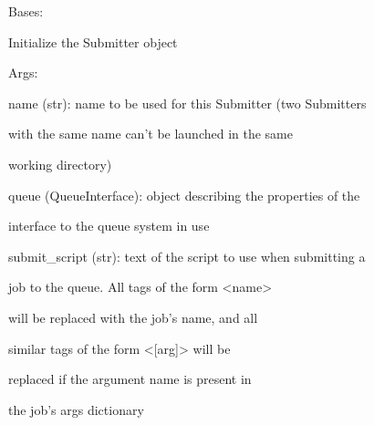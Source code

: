 \documentclass[letterpaper,10pt,english]{sphinxmanual}
\begin{document}
\begin{fulllineitems}
\label{doctree/soprano.hpc.submitter.castep:soprano.hpc.submitter.castep.CastepSubmitter}
Bases: {\hyperref[doctree/soprano.hpc.submitter.submit:soprano.hpc.submitter.submit.Submitter]{}}

Initialize the Submitter object

\begin{DUlineblock}{0em}
\item[] Args:
\item[]
\begin{DUlineblock}{\DUlineblockindent}
\item[] name (str): name to be used for this Submitter (two Submitters
\item[]
\begin{DUlineblock}{\DUlineblockindent}
\item[] with the same name can't be launched in the same
\item[] working directory)
\end{DUlineblock}
\item[] queue (QueueInterface): object describing the properties of the
\item[]
\begin{DUlineblock}{\DUlineblockindent}
\item[] interface to the queue system in use
\end{DUlineblock}
\item[] submit\_script (str): text of the script to use when submitting a
\item[]
\begin{DUlineblock}{\DUlineblockindent}
\item[] job to the queue. All tags of the form \textless{}name\textgreater{}
\item[] will be replaced with the job's name, and all
\item[] similar tags of the form \textless{}{[}arg{]}\textgreater{} will be
\item[] replaced if the argument name is present in
\item[] the job's args dictionary
\end{DUlineblock}

\end{DUlineblock}
\end{DUlineblock}
\end{fulllineitems}
\end{document}

